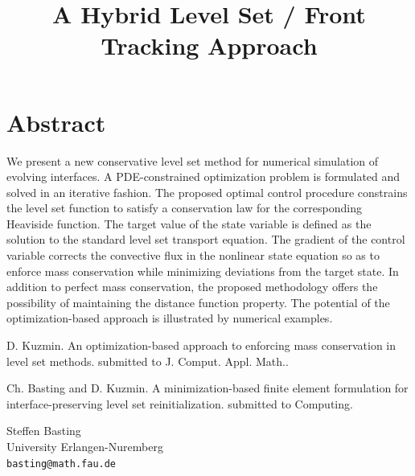 \documentclass[article,A4,11pt]{llncs}%
\begin{document}
\section*{Abstract}
We present a new conservative level set method for numerical simulation of evolving  interfaces. A PDE-constrained optimization problem is formulated and solved in an iterative fashion. The proposed optimal control procedure constrains the level set function to satisfy a conservation law for the corresponding Heaviside function. The target value of the state variable is defined as the solution to the standard level set transport equation. The gradient of the control variable corrects the convective flux in the nonlinear state equation so as to enforce mass conservation while minimizing deviations from the target state. In addition to perfect mass conservation, the proposed methodology offers the possibility of maintaining the distance function property. The potential of the optimization-based approach is illustrated by numerical examples.


\begin{thebibliography}{10}
{\sc D. Kuzmin}. {An optimization-based approach to enforcing mass conservation in level set methods}. submitted to J. Comput. Appl. Math..

{\sc Ch. Basting and D. Kuzmin}. {A minimization-based finite element formulation for interface-preserving level set reinitialization}. submitted to Computing.
\end{thebibliography}

\title{A Hybrid Level Set / Front Tracking Approach}
 \author{} \institute{}
\maketitle
\begin{center}
{\large Steffen Basting}\\
University Erlangen-Nuremberg\\
{\tt basting@math.fau.de}
\end{center}
\end{document}
